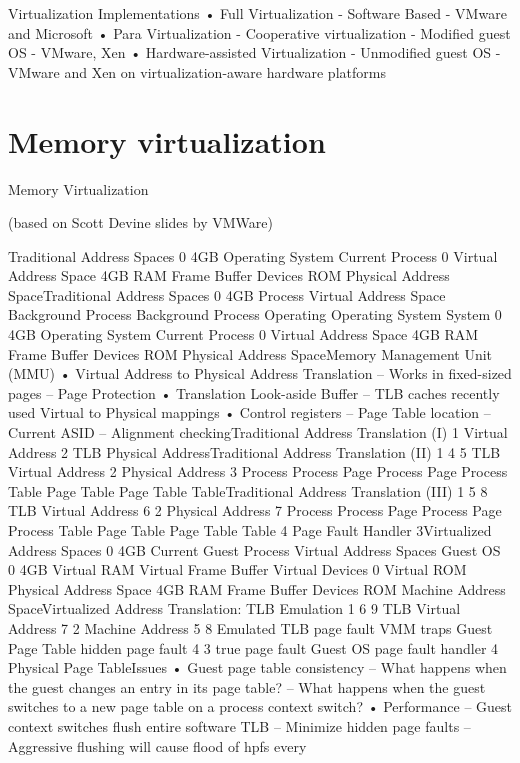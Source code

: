 \documentclass[10pt]{article}
\begin{document}
Virtualization Implementations
• Full Virtualization
- Software Based
- VMware and Microsoft
• Para Virtualization
- Cooperative virtualization
- Modified guest OS
- VMware, Xen
• Hardware-assisted Virtualization
- Unmodified guest OS
- VMware and Xen on virtualization-aware hardware platforms

\section{Memory virtualization}

Memory Virtualization

(based on Scott Devine slides by VMWare)


Traditional Address Spaces
0
4GB
Operating
System
Current Process
0
Virtual
Address Space
4GB
RAM
Frame
Buffer
Devices
ROM
Physical
Address SpaceTraditional Address Spaces
0
4GB
Process Virtual Address Space
Background Process
Background Process
Operating
Operating
System
System
0
4GB
Operating
System
Current Process
0
Virtual
Address Space
4GB
RAM
Frame
Buffer
Devices
ROM
Physical
Address SpaceMemory Management Unit (MMU)
•  Virtual Address to Physical Address
Translation
–  Works in fixed-sized pages
–  Page Protection
•  Translation Look-aside Buffer
–  TLB caches recently used Virtual to Physical
mappings
•  Control registers
–  Page Table location
–  Current ASID
–  Alignment checkingTraditional Address Translation (I)
1
Virtual Address
2
TLB
Physical AddressTraditional Address Translation (II)
1
4
5
TLB
Virtual Address
2
Physical Address
3
Process
Process
Page
Process
Page
Process
Table
Page
Table
Page
Table
TableTraditional Address Translation (III)
1
5
8
TLB
Virtual Address
6
2
Physical Address
7
Process
Process
Page
Process
Page
Process
Table
Page
Table
Page
Table
Table
4
Page
Fault
Handler
3Virtualized Address Spaces
0
4GB
Current Guest Process
Virtual
Address Spaces
Guest OS
0
4GB
Virtual RAM
Virtual
Frame
Buffer
Virtual
Devices
0
Virtual
ROM
Physical
Address Space
4GB
RAM
Frame
Buffer
Devices
ROM
Machine
Address SpaceVirtualized Address Translation:
TLB Emulation
1
6
9
TLB
Virtual Address
7
2
Machine Address
5
8
Emulated
TLB
page
fault
VMM
traps
Guest
Page
Table
hidden
page
fault
4
3
true
page
fault
Guest OS
page fault
handler
4
Physical
Page
TableIssues
•  Guest page table consistency
–  What happens when the guest changes an entry
in its page table?
–  What happens when the guest switches to a new
page table on a process context switch?
•  Performance
–  Guest context switches flush entire software TLB
–  Minimize hidden page faults
–  Aggressive flushing will cause flood of hpfs every
\end{document}
